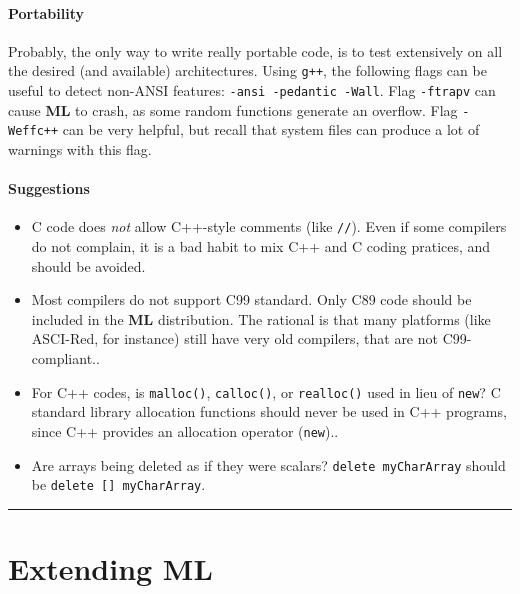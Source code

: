 \documentclass[10pt,letter,relax]{SANDreport}
\newcommand{\HRule}{\noindent\rule{\linewidth}{1mm}}
\newcommand{\ML}     {{\bf ML }}
\begin{document}
\subsection{Portability}

Probably, the only way to write really portable code, is to test
extensively on all the desired (and available) architectures. Using
\verb!g++!, the following flags can be useful to detect non-ANSI
features: \verb!-ansi -pedantic -Wall!. Flag \verb!-ftrapv! can cause
\ML to crash, as some random functions generate an overflow. Flag
\verb!-Weffc++! can be very helpful, but recall that system files can
produce a lot of warnings with this flag.

\subsection{Suggestions}

\begin{itemize}
\item C code does {\sl not} allow C++-style comments (like
  \verb!//!). Even if some compilers do not complain, it is a bad
  habit to mix C++ and C coding pratices, and should be avoided.
\item Most compilers do not support C99 standard. Only C89 code should
  be included in the \ML distribution. The rational is that many
  platforms (like ASCI-Red, for instance) still have very old compilers,
  that are not C99-compliant..
\item For C++ codes, is \verb!malloc()!, \verb!calloc()!, or
  \verb!realloc()! used in lieu of \verb!new!?  C standard library
  allocation functions should never be used in C++ programs, since C++
  provides an allocation operator (\verb!new!)..
\item Are arrays being deleted as if they were scalars?  {\tt delete
    myCharArray} should be {\tt delete [] myCharArray}.
\end{itemize}


\clearpage
\newpage

\vspace*{3cm}
\HRule
\part{Extending ML}
\end{document}
